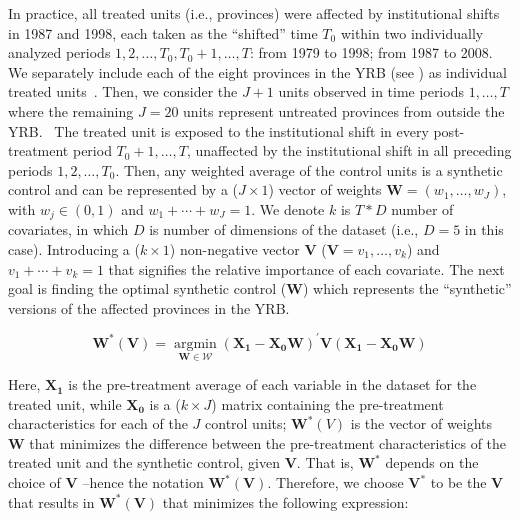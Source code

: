 In practice, all treated units (i.e., provinces) were affected by institutional shifts in 1987 and 1998, each taken as the ``shifted'' time $T_0$ within two individually analyzed periods $1, 2, \dots, T_0, T_0 + 1, \dots, T$: from 1979 to 1998; from 1987 to 2008.
We separately include each of the eight provinces in the YRB (see \textit{}) as individual treated units~\cite{abadie2021}.
Then, we consider the $J+1$ units observed in time periods $1, \dots, T$ where the remaining $J=20$ units represent untreated provinces from outside the YRB.\
The treated unit is exposed to the institutional shift in every post-treatment period $T_0 +1, \dots, T$, unaffected by the institutional shift in all preceding periods $1, 2, \dots, T_0$.
Then, any weighted average of the control units is a synthetic control and can be represented by a ($J \times 1$) vector of weights $\mathbf{W} = (w_{1}, \ldots ,w_{J})$, with $w_j \in (0, 1)$ and $w_1 + \cdots  + w_{J} = 1$.
We denote $k$ is $T * D$ number of covariates, in which $D$ is number of dimensions of the dataset (i.e., $D = 5$ in this case).
Introducing a ($k \times 1$) non-negative vector $\mathbf{V}$ ($\mathbf{V} = v_{1}, \ldots ,v_{k}$) and $v_1 + \cdots  + v_{k} = 1$ that signifies the relative importance of each covariate.
The next goal is finding the optimal synthetic control ($\mathbf{W}$) which represents the ``synthetic'' versions of the affected provinces in the YRB.\

\begin{equation}
    \mathbf{W^{*}(V)}=\underset{\mathbf{W} \in \mathcal{W}}{\operatorname{argmin}}\left(\mathbf{X}_{\mathbf{1}}-\mathbf{X}_{\mathbf{0}} \mathbf{W}\right)^{\prime} \mathbf{V}\left(\mathbf{X}_{\mathbf{1}}-\mathbf{X}_{\mathbf{0}} \mathbf{W}\right)
\end{equation}

Here, $\mathbf{X_1}$ is the pre-treatment average of each variable in the dataset for the treated unit, while $\mathbf{X_0}$ is a ($k \times J$) matrix containing the pre-treatment characteristics for each of the $J$ control units; $\mathbf{W}^{*}(V)$ is the vector of weights $\mathbf{W}$ that minimizes the difference between the pre-treatment characteristics of the treated unit and the synthetic control, given $\mathbf{V}$. That is, $\mathbf{W^{*}}$ depends on the choice of $\mathbf{V}$ –hence the notation $\mathbf{W^{*}(V)}$. Therefore, we choose $\mathbf{V^{*}}$ to be the $\mathbf{V}$ that results in $\mathbf{{W}^{*}(V)}$ that minimizes the following expression:

